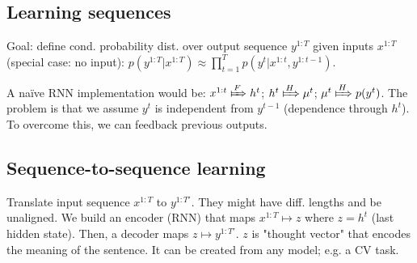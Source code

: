 \subsection*{Learning sequences}
Goal: define cond. probability dist. over output sequence $y^{1:T}$ given inputs $x^{1:T}$ (special case: no input): $p(y^{1:T} | x^{1:T}) \approx \prod_{t=1}^Tp(y^t | x^{1:t}, y^{1:t-1})$.

A naïve RNN implementation would be: $x^{1:t} \xMapsto[]{F} h^t$; $h^t \xMapsto[]{H}\mu^t$; $\mu^t\xMapsto[]{H}p(y^t)$. The problem is that we assume $y^t$ is independent from $y^{t-1}$ (dependence through $h^t$). To overcome this, we can feedback previous outputs. 

\subsection*{Sequence-to-sequence learning}
Translate input sequence $x^{1:T}$ to $y^{1:T'}$. They might have diff. lengths and be unaligned. We build an encoder (RNN) that maps $x^{1:T} \mapsto z$ where $z=h^t$ (last hidden state). Then, a decoder maps $z \mapsto y^{1:T'}$. $z$ is "thought vector" that encodes the meaning of the sentence. It can be created from any model; e.g. a CV task.